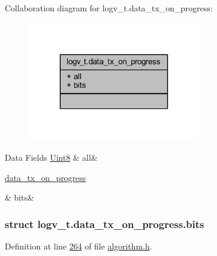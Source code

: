 Collaboration diagram for logv\+\_\+t.\+data\+\_\+tx\+\_\+on\+\_\+progress\+:\nopagebreak
\begin{figure}[H]
\begin{center}
\leavevmode
\includegraphics[width=215pt]{de/dc8/a00889}
\end{center}
\end{figure}
\begin{DoxyFields}{Data Fields}
\hypertarget{a00021_aa181a603769c1f98ad927e7367c7aa51}{\hyperlink{a00072_af84840501dec18061d18a68c162a8fa2}{Uint8}}\label{a00021_aa181a603769c1f98ad927e7367c7aa51}
&
all&
\\
\hline

\hypertarget{a00021_acc411e6c13670e52124629b8ac83f7d0}{\hyperlink{a00021_d9/dad/a00591}{data\+\_\+tx\+\_\+on\+\_\+progress}}\label{a00021_acc411e6c13670e52124629b8ac83f7d0}
&
bits&
\\
\hline

\end{DoxyFields}
\label{d9/dad/a00591}
\hypertarget{a00021_d9/dad/a00591}{}
\subsubsection{struct logv\+\_\+t.\+data\+\_\+tx\+\_\+on\+\_\+progress.\+bits}


Definition at line \hyperlink{a00021_source_l00264}{264} of file \hyperlink{a00021_source}{algorithm.\+h}.



